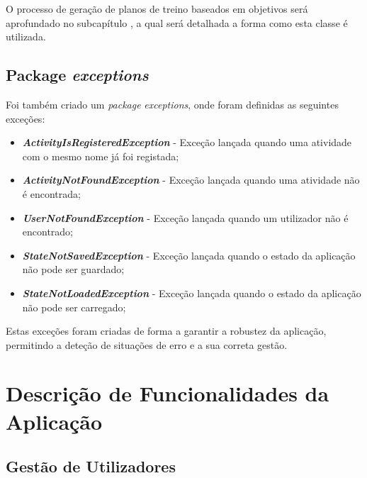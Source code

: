 \documentclass[a4paper,12pt]{scrreprt}
\begin{document}
    O processo de geração de planos de treino baseados em objetivos será aprofundado no subcapítulo \textit{},
    a qual será detalhada a forma como esta classe é utilizada.

\section{Package \textit{exceptions}}
    Foi também criado um \textit{package} \textit{exceptions}, onde foram definidas as seguintes exceções:

    \begin{itemize}
        \item \textit{\textbf{ActivityIsRegisteredException}} - Exceção lançada quando uma atividade com o mesmo nome já foi registada;
        \item \textit{\textbf{ActivityNotFoundException}} - Exceção lançada quando uma atividade não é encontrada;
        \item \textit{\textbf{UserNotFoundException}} - Exceção lançada quando um utilizador não é encontrado;
        \item \textit{\textbf{StateNotSavedException}} - Exceção lançada quando o estado da aplicação não pode ser guardado;
        \item \textit{\textbf{StateNotLoadedException}} - Exceção lançada quando o estado da aplicação não pode ser carregado;
    \end{itemize}

    Estas exceções foram criadas de forma a garantir a robustez da aplicação,
    permitindo a deteção de situações de erro e a sua correta gestão.



\chapter{Descrição de Funcionalidades da Aplicação}

\section{Gestão de Utilizadores}
    \label{sec:gestao-utlizadores}
\end{document}
